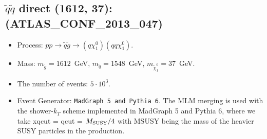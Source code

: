 \documentclass[12pt]{article}
\begin{document}
    
\subsection{$\tilde q \tilde q$ direct (1612, 37): (ATLAS\_CONF\_2013\_047)} 


        \begin{itemize}
        \item  Process: $pp \to \tilde q \tilde g \to (q \chi_1^0)(q q \chi_1^0)$.
        \item  Mass: $m_{\tilde g} = 1612$~GeV, $m_{\tilde q} = 1548$~GeV, $m_{\tilde \chi_1^0} = 37$~GeV.
        \item  The number of events: $5 \cdot 10^3$.
        \item  Event Generator: {\tt MadGraph 5 and Pythia 6}.
                The MLM merging is used with the shower-$k_T$ scheme implemented in MadGraph 5 and Pythia 6, where we take xqcut = qcut = $M_{\rm SUSY}/4$ with MSUSY being the mass of the heavier SUSY particles in the production.      
        \end{itemize}    
    
\end{document}
